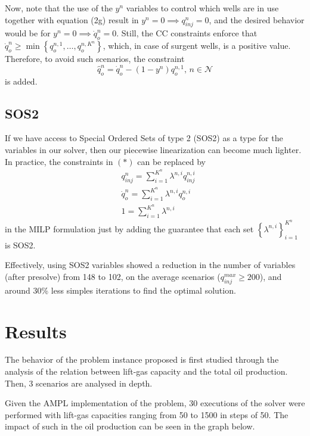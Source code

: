 \documentclass[a4paper]{report}
\begin{document}
Now, note that the use of the $y^{n}$ variables to control which wells are in use together with equation (2g) result in $y^{n} = 0 \implies q_{inj}^{n} = 0$, and the desired behavior would be for $y^{n}=0 \implies \dot{q}_o^{n} = 0$. Still, the CC constraints enforce that $\dot{q}_o^{n} \ge \min \left\{ q_o^{n,1},\ldots,q_o^{n,K^{n}} \right\} $, which, in case of surgent wells, is a positive value. Therefore, to avoid such scenarios, the constraint \[
\hat{q}_o^{n} = \dot{q}_o^{n} - \left( 1 - y^{n} \right) q_o^{n,1},\, n\in \mathcal{N}
\] 
is added.

\subsection{SOS2}

If we have access to Special Ordered Sets of type 2 (SOS2) as a type for the variables in our solver, then our piecewise linearization can become much lighter. In practice, the constraints in $\left( * \right) $ can be replaced by
\begin{align*}
    &q_{inj}^{n} = \sum_{i=1}^{K^{n}} \lambda^{n,i} q_{inj}^{n,i} \\
    &\dot{q}_o^{n} = \sum_{i=1}^{K^{n}} \lambda^{n,i} q_o^{n,i} \\
    &1 = \sum_{i=1}^{K^{n}} \lambda^{n,i}
\end{align*}
in the MILP formulation just by adding the guarantee that each set $\left\{ \lambda^{n,i} \right\}_{i=1}^{K^{n}} $ is SOS2.

Effectively, using SOS2 variables showed a reduction in the number of variables (after presolve) from 148 to 102, on the average scenarios ($q_{inj}^{max} \ge 200$), and around 30\% less simples iterations to find the optimal solution.

\section{Results}

The behavior of the problem instance proposed is first studied through the analysis of the relation between lift-gas capacity and the total oil production. Then, 3 scenarios are analysed in depth.

Given the AMPL implementation of the problem, 30 executions of the solver were performed with lift-gas capacities ranging from 50 to 1500 in steps of 50. The impact of such in the oil production can be seen in the graph below.
\end{document}
